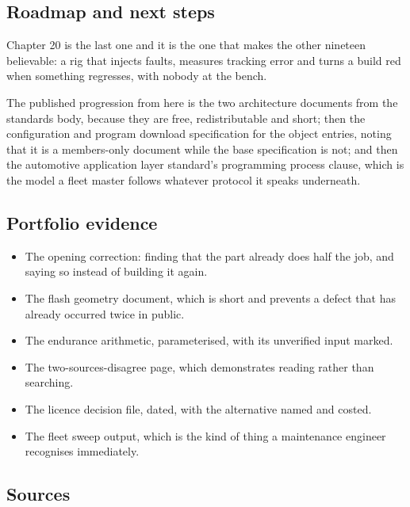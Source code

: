 \subsection*{Roadmap and next steps}

Chapter 20 is the last one and it is the one that makes the other nineteen
believable: a rig that injects faults, measures tracking error and turns a build
red when something regresses, with nobody at the bench.

The published progression from here is the two architecture documents from the
standards body, because they are free, redistributable and short; then the
configuration and program download specification for the object entries, noting
that it is a members-only document while the base specification is not; and then
the automotive application layer standard's programming process clause, which is
the model a fleet master follows whatever protocol it speaks underneath.

\subsection*{Portfolio evidence}

\begin{itemize}
\item The opening correction: finding that the part already does half the job,
and saying so instead of building it again.
\item The flash geometry document, which is short and prevents a defect that has
already occurred twice in public.
\item The endurance arithmetic, parameterised, with its unverified input marked.
\item The two-sources-disagree page, which demonstrates reading rather than
searching.
\item The licence decision file, dated, with the alternative named and costed.
\item The fleet sweep output, which is the kind of thing a maintenance engineer
recognises immediately.
\end{itemize}

\subsection*{Sources}

